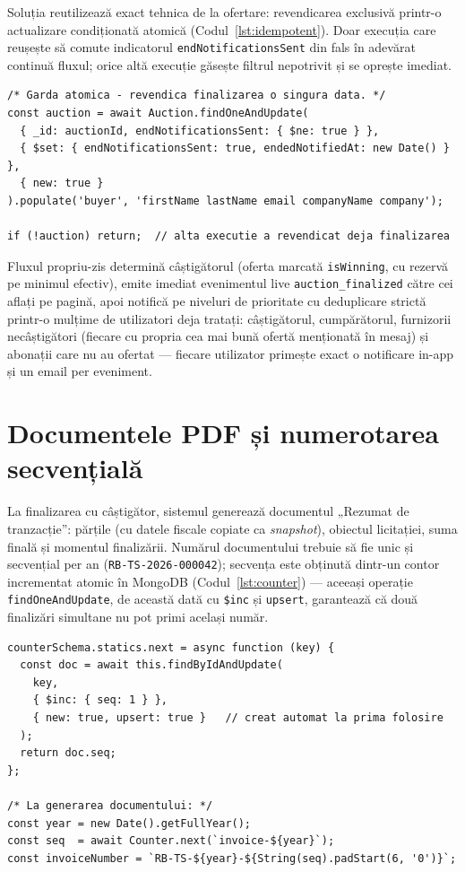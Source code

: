 Soluția reutilizează exact tehnica de la ofertare: revendicarea exclusivă printr-o actualizare condiționată atomică (Codul~\ref{lst:idempotent}). Doar execuția care reușește să comute indicatorul \texttt{endNotificationsSent} din fals în adevărat continuă fluxul; orice altă execuție găsește filtrul nepotrivit și se oprește imediat.

\begin{lstlisting}[caption={Garda de idempotență a finalizării (server/services/auctionNotify.js)},label={lst:idempotent}]
/* Garda atomica - revendica finalizarea o singura data. */
const auction = await Auction.findOneAndUpdate(
  { _id: auctionId, endNotificationsSent: { $ne: true } },
  { $set: { endNotificationsSent: true, endedNotifiedAt: new Date() } },
  { new: true }
).populate('buyer', 'firstName lastName email companyName company');

if (!auction) return;  // alta executie a revendicat deja finalizarea
\end{lstlisting}

Fluxul propriu-zis determină câștigătorul (oferta marcată \texttt{isWinning}, cu rezervă pe minimul efectiv), emite imediat evenimentul live \texttt{auction\_finalized} către cei aflați pe pagină, apoi notifică pe niveluri de prioritate cu deduplicare strictă printr-o mulțime de utilizatori deja tratați: câștigătorul, cumpărătorul, furnizorii necâștigători (fiecare cu propria cea mai bună ofertă menționată în mesaj) și abonații care nu au ofertat --- fiecare utilizator primește exact o notificare in-app și un email per eveniment.

\section{Documentele PDF și numerotarea secvențială}

La finalizarea cu câștigător, sistemul generează documentul „Rezumat de tranzacție'': părțile (cu datele fiscale copiate ca \textit{snapshot}), obiectul licitației, suma finală și momentul finalizării. Numărul documentului trebuie să fie unic și secvențial per an (\texttt{RB-TS-2026-000042}); secvența este obținută dintr-un contor incrementat atomic în MongoDB (Codul~\ref{lst:counter}) --- aceeași operație \texttt{findOneAndUpdate}, de această dată cu \texttt{\$inc} și \texttt{upsert}, garantează că două finalizări simultane nu pot primi același număr.

\begin{lstlisting}[caption={Contorul atomic de numerotare (server/models/Counter.js) și utilizarea lui},label={lst:counter}]
counterSchema.statics.next = async function (key) {
  const doc = await this.findByIdAndUpdate(
    key,
    { $inc: { seq: 1 } },
    { new: true, upsert: true }   // creat automat la prima folosire
  );
  return doc.seq;
};

/* La generarea documentului: */
const year = new Date().getFullYear();
const seq  = await Counter.next(`invoice-${year}`);
const invoiceNumber = `RB-TS-${year}-${String(seq).padStart(6, '0')}`;
\end{lstlisting}

